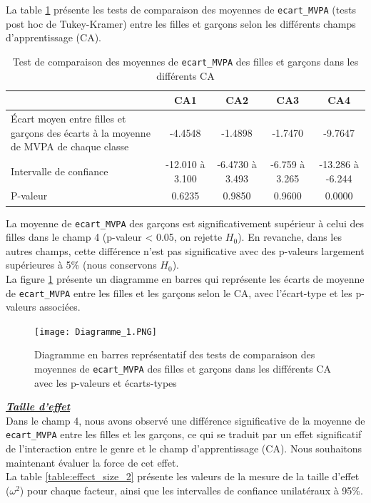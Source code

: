 \documentclass[12pt,a4paper]{article}
\begin{document}
\begin{enumerate}[label=\textbf{\alph*})]
	La table \ref{tab:ecarts_mvpa_1} présente les tests de comparaison des moyennes de \texttt{ecart\_MVPA} (tests post hoc de Tukey-Kramer) entre les filles et garçons selon les différents champs d'apprentissage (CA).\\
	\begin{table}[H]
		\centering
		\caption{Test de comparaison des moyennes de \texttt{ecart\_MVPA} des filles et garçons dans les différents CA}
		\begin{tabular}{|p{5cm}|c|c|c|c|}
			\hline
			& CA1 & CA2 & CA3 & CA4 \\ 
			\hline
			Écart moyen entre filles et garçons des écarts à la moyenne de MVPA de chaque classe & -4.4548 & -1.4898 & -1.7470 & -9.7647 \\ 
			\hline
			Intervalle de confiance & -12.010 à 3.100 & -6.4730 à 3.493 & -6.759 à 3.265 & -13.286 à -6.244 \\ 
			\hline
			P-valeur & 0.6235 & 0.9850 & 0.9600 & 0.0000 \\ 
			\hline
		\end{tabular}
		\label{tab:ecarts_mvpa_1}
	\end{table}
	
	
	La moyenne de \texttt{ecart\_MVPA} des garçons est significativement supérieur à celui des filles dans le champ 4 (p-valeur < 0.05, on rejette $H_0$). En revanche, dans les autres champs, cette différence n'est pas significative avec des p-valeurs largement supérieures à 5\% (nous conservons $H_0$). \\
	
	La figure \ref{fig:Test post hoc_garphe_1} présente un diagramme en barres qui représente les écarts de moyenne de \texttt{ecart\_MVPA} entre les filles et les garçons selon le CA, avec l'écart-type et les p-valeurs associées.\\
	
	\begin{figure}[H]
		\centering
		\texttt{[image: Diagramme\_1.PNG]}
		\caption{Diagramme en barres représentatif des tests de comparaison des moyennes de \texttt{ecart\_MVPA} des filles et garçons dans les différents CA avec les p-valeurs et écarts-types}
		\label{fig:Test post hoc_garphe_1}
	\end{figure}

	
\textbf{\textit{\underline{Taille d'effet}}}\\

Dans le champ 4, nous avons observé une différence significative de la moyenne de \texttt{ecart\_MVPA} entre les filles et les garçons, ce qui se traduit par un effet significatif de l'interaction entre le genre et le champ d'apprentissage (CA). Nous souhaitons maintenant évaluer la force de cet effet.\\
La table \ref{table:effect_size_2} présente les valeurs de la mesure de la taille d'effet ($\omega^2$) pour chaque facteur, ainsi que les intervalles de confiance unilatéraux à 95\%.\\


\end{enumerate}
\end{document}
